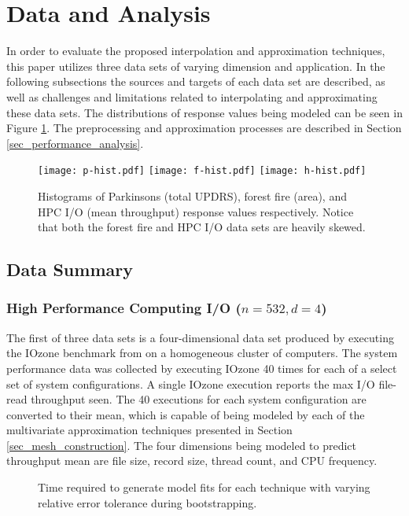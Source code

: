 \section{Data and Analysis}
In order to evaluate the proposed interpolation and approximation techniques, this paper utilizes three data sets of varying dimension and application. In the following subsections the sources and targets of each data set are described, as well as challenges and limitations related to interpolating and approximating these data sets. The distributions of response values being modeled can be seen in Figure \ref{fig_response_hists}. The preprocessing and approximation processes are described in Section \ref{sec_performance_analysis}.

\begin{figure}
  \texttt{[image: p-hist.pdf]}
  \texttt{[image: f-hist.pdf]}
  \texttt{[image: h-hist.pdf]}
  \caption{Histograms of Parkinsons (total UPDRS), forest fire (area), and HPC I/O (mean throughput) response values respectively. Notice that both the forest fire and HPC I/O data sets are heavily skewed.
  \vspace{-.5cm}}
  \label{fig_response_hists}
\end{figure}

\subsection{Data Summary}

\subsubsection{High Performance Computing I/O ($n = 532, d = 4$)}
The first of three data sets is a four-dimensional data set produced by executing the IOzone benchmark from \cite{iozone} on a homogeneous cluster of computers. The system performance data was collected by executing IOzone 40 times for each of a select set of system configurations. A single IOzone execution reports the max I/O file-read throughput seen. The 40 executions for each system configuration are converted to their mean, which is capable of being modeled by each of the multivariate approximation techniques presented in Section \ref{sec_mesh_construction}. The four dimensions being modeled to predict throughput mean are file size, record size, thread count, and CPU frequency.

\begin{figure*}[htb]
  \caption{Time required to generate model fits for each technique with varying relative error tolerance during bootstrapping.
    \vspace{-.3cm}}
  \label{fig_eval_times}
\end{figure*}

